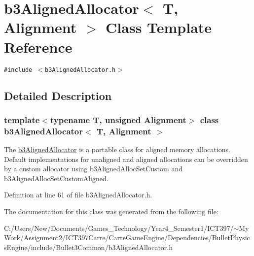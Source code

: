 \hypertarget{classb3_aligned_allocator}{
\section{b3AlignedAllocator$<$ T, Alignment $>$ Class Template Reference}
\label{classb3_aligned_allocator}
}
{\tt \#include $<$b3AlignedAllocator.h$>$}



\subsection{Detailed Description}
\subsubsection*{template$<$typename T, unsigned Alignment$>$ class b3AlignedAllocator$<$ T, Alignment $>$}

The \hyperlink{classb3_aligned_allocator}{b3AlignedAllocator} is a portable class for aligned memory allocations. Default implementations for unaligned and aligned allocations can be overridden by a custom allocator using b3AlignedAllocSetCustom and b3AlignedAllocSetCustomAligned. 

Definition at line 61 of file b3AlignedAllocator.h.

The documentation for this class was generated from the following file:\begin{CompactItemize}
\item 
C:/Users/New/Documents/Games\_\-Technology/Year4\_\-Semester1/ICT397/$\sim$My Work/Assignment2/ICT397Carre/CarreGameEngine/Dependencies/BulletPhysicsEngine/include/Bullet3Common/b3AlignedAllocator.h\end{CompactItemize}
